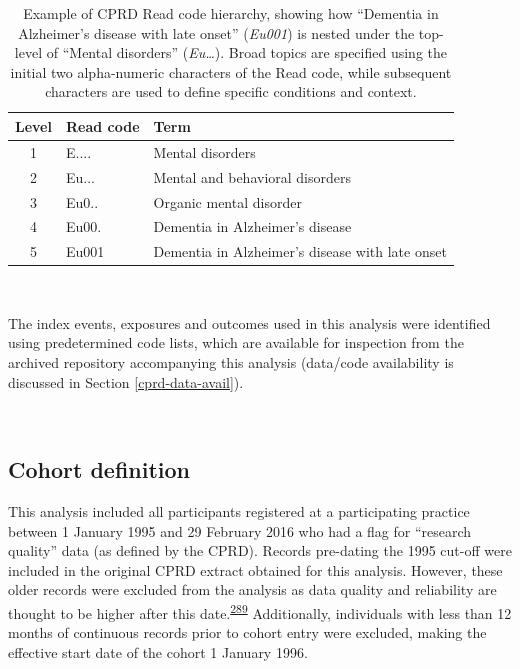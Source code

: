 \documentclass[a4paper, twoside]{templates/ociamthesis}
\begin{document}
\begin{table}[H]

\caption[Example of CPRD Read code hierarchy]{\label{tab:readExample-table}Example of CPRD Read code hierarchy, showing how ``Dementia in Alzheimer's disease with late onset'' (\emph{Eu001}) is nested under the top-level of ``Mental disorders'' (\emph{Eu\ldots{}}). Broad topics are specified using the initial two alpha-numeric characters of the Read code, while subsequent characters are used to define specific conditions and context.}
\centering
\begin{tabular}[t]{cll}
\toprule
\textbf{Level} & \textbf{Read code} & \textbf{Term}\\
\midrule
1 & E.... & Mental disorders\\
2 & Eu... & Mental and behavioral disorders\\
3 & Eu0.. & Organic mental disorder\\
4 & Eu00. & Dementia in Alzheimer's disease\\
5 & Eu001 & Dementia in Alzheimer's disease with late onset\\
\bottomrule
\end{tabular}
\end{table}

~

The index events, exposures and outcomes used in this analysis were identified using predetermined code lists, which are available for inspection from the archived repository accompanying this analysis (data/code availability is discussed in Section \ref{cprd-data-avail}).

~

\hypertarget{cohort-definition}{%
\subsection{Cohort definition}\label{cohort-definition}}

This analysis included all participants registered at a participating practice between 1 January 1995 and 29 February 2016 who had a flag for ``research quality'' data (as defined by the CPRD). Records pre-dating the 1995 cut-off were included in the original CPRD extract obtained for this analysis. However, these older records were excluded from the analysis as data quality and reliability are thought to be higher after this date.\textsuperscript{\protect\hyperlink{ref-wolf2019}{289}} Additionally, individuals with less than 12 months of continuous records prior to cohort entry were excluded, making the effective start date of the cohort 1 January 1996.
\end{document}
